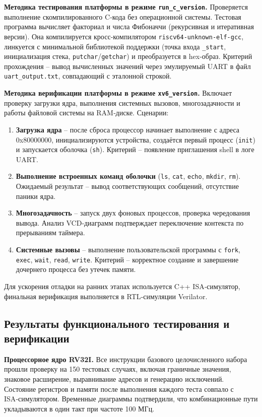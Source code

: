 \textbf{Методика тестирования платформы в режиме \texttt{run\_c\_version}.} Проверяется выполнение скомпилированного C‑кода без операционной системы. Тестовая программа вычисляет факториал и числа Фибоначчи (рекурсивная и итеративная версии). Она компилируется кросс‑компилятором \texttt{riscv64-unknown-elf-gcc}, линкуется с минимальной библиотекой поддержки (точка входа \texttt{\_start}, инициализация стека, \texttt{putchar}/\texttt{getchar}) и преобразуется в hex‑образ. Критерий прохождения – вывод вычисленных значений через эмулируемый UART в файл \texttt{uart\_output.txt}, совпадающий с эталонной строкой.

\textbf{Методика верификации платформы в режиме \texttt{xv6\_version}.} Включает проверку загрузки ядра, выполнения системных вызовов, многозадачности и работы файловой системы на RAM‑диске. Сценарии:
\begin{enumerate}
\item \textbf{Загрузка ядра} – после сброса процессор начинает выполнение с адреса 0x80000000, инициализируются устройства, создаётся первый процесс (\texttt{init}) и запускается оболочка (\texttt{sh}). Критерий – появление приглашения shell в логе UART.
\item \textbf{Выполнение встроенных команд оболочки} (\texttt{ls}, \texttt{cat}, \texttt{echo}, \texttt{mkdir}, \texttt{rm}). Ожидаемый результат – вывод соответствующих сообщений, отсутствие паники ядра.
\item \textbf{Многозадачность} – запуск двух фоновых процессов, проверка чередования вывода. Анализ VCD‑диаграмм подтверждает переключение контекста по прерываниям таймера.
\item \textbf{Системные вызовы} – выполнение пользовательской программы с \texttt{fork}, \texttt{exec}, \texttt{wait}, \texttt{read}, \texttt{write}. Критерий – корректное создание и завершение дочернего процесса без утечек памяти.
\end{enumerate}
Для ускорения отладки на ранних этапах используется C++ ISA‑симулятор, финальная верификация выполняется в RTL‑симуляции Verilator.

\subsection{Результаты функционального тестирования и верификации}

\textbf{Процессорное ядро RV32I.} Все инструкции базового целочисленного набора прошли проверку на 150 тестовых случаях, включая граничные значения, знаковое расширение, выравнивание адресов и генерацию исключений. Состояние регистров и памяти после выполнения каждого теста совпало с ISA‑симулятором. Временные диаграммы подтвердили, что комбинационные пути укладываются в один такт при частоте 100 МГц.

